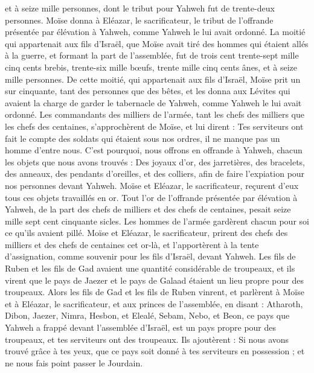 \begin{multicols}{2}
et à seize mille personnes, dont le tribut pour Yahweh fut de trente-deux personnes.
Moïse donna à Eléazar, le sacrificateur, le tribut de l'offrande présentée par élévation à Yahweh, comme Yahweh le lui avait ordonné.
La moitié qui appartenait aux fils d'Israël, que Moïse avait tiré des hommes qui étaient allés à la guerre,
et formant la part de l'assemblée, fut de trois cent trente-sept mille cinq cents brebis,
trente-six mille bœufs,
trente mille cinq cents ânes,
et à seize mille personnes.
De cette moitié, qui appartenait aux fils d'Israël, Moïse prit un sur cinquante, tant des personnes que des bêtes, et les donna aux Lévites qui avaient la charge de garder le tabernacle de Yahweh, comme Yahweh le lui avait ordonné.
Les commandants des milliers de l'armée, tant les chefs des milliers que les chefs des centaines, s'approchèrent de Moïse,
et lui dirent : Tes serviteurs ont fait le compte des soldats qui étaient sous nos ordres, il ne manque pas un homme d’entre nous.
C'est pourquoi, nous offrons en offrande à Yahweh, chacun les objets que nous avons trouvés : Des joyaux d'or, des jarretières, des bracelets, des anneaux, des pendants d'oreilles, et des colliers, afin de faire l’expiation pour nos personnes devant Yahweh.
Moïse et Eléazar, le sacrificateur, reçurent d'eux tous ces objets travaillés en or.
Tout l'or de l'offrande présentée par élévation à Yahweh, de la part des chefs de milliers et des chefs de centaines, pesait seize mille sept cent cinquante sicles.
Les hommes de l’armée gardèrent chacun pour soi ce qu'ils avaient pillé.
Moïse et Eléazar, le sacrificateur, prirent des chefs des milliers et des chefs de centaines cet or-là, et l'apportèrent à la tente d'assignation, comme souvenir pour les fils d'Israël, devant Yahweh.
\VerseOne{}Les fils de Ruben et les fils de Gad avaient une quantité considérable de troupeaux, et ils virent que le pays de Jaezer et le pays de Galaad étaient un lieu propre pour des troupeaux.
Alors les fils de Gad et les fils de Ruben vinrent, et parlèrent à Moïse et à Eléazar, le sacrificateur, et aux princes de l'assemblée, en disant :
Atharoth, Dibon, Jaezer, Nimra, Hesbon, et Elealé, Sebam, Nebo, et Beon,
ce pays que Yahweh a frappé devant l'assemblée d'Israël, est un pays propre pour des troupeaux, et tes serviteurs ont des troupeaux.
Ils ajoutèrent : Si nous avons trouvé grâce à tes yeux, que ce pays soit donné à tes serviteurs en possession ; et ne nous fais point passer le Jourdain.

\end{multicols}
